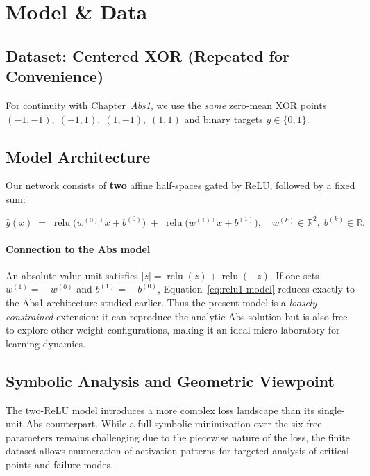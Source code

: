 \section{Model \& Data}
\label{sec:relu1-model-data}

\subsection*{Dataset: Centered XOR (Repeated for Convenience)}
For continuity with Chapter~\textit{Abs1}, we use the \emph{same} zero-mean XOR points \(({-}1,{-}1),\;({-}1,1),\;(1,{-}1),\;(1,1)\) and binary targets \(y\in\{0,1\}\).

\subsection*{Model Architecture}
Our network consists of \textbf{two} affine half-spaces gated by ReLU, followed by a fixed sum:

\begin{equation}
    \hat y(x)
    \;=\;
    \operatorname{relu}\!\bigl(w^{(0)\!\top}x + b^{(0)}\bigr)
    \;+\;
    \operatorname{relu}\!\bigl(w^{(1)\!\top}x + b^{(1)}\bigr),
    \quad
    w^{(k)}\!\in\mathbb{R}^{2},\;
    b^{(k)}\!\in\mathbb{R}.
    \label{eq:relu1-model}
\end{equation}

\paragraph{Connection to the Abs model}
An absolute-value unit satisfies \(|z|=\operatorname{relu}(z)+\operatorname{relu}(-z).\) If one sets \(w^{(1)}=-\,w^{(0)}\) and \(b^{(1)}=-\,b^{(0)}\), Equation~\eqref{eq:relu1-model} reduces exactly to the Abs1 architecture studied earlier. Thus the present model is a \emph{loosely constrained} extension: it can reproduce the analytic Abs solution but is also free to explore other weight configurations, making it an ideal micro-laboratory for learning dynamics.

\subsection*{Symbolic Analysis and Geometric Viewpoint}
\label{sec:relu1-analysis}

The two-ReLU model introduces a more complex loss landscape than its single-unit Abs counterpart. While a full symbolic minimization over the six free parameters remains challenging due to the piecewise nature of the loss, the finite dataset allows enumeration of activation patterns for targeted analysis of critical points and failure modes.

